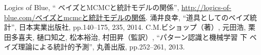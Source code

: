 \documentclass[11pt, a4paper]{jarticle}
\begin{document}
\begin{thebibliography}{9}
	\bibitem{}Logics of Blue, “ ベイズとMCMCと統計モデルの関係”, \url{http://logics-of-blue.com/ベイズとmcmcと統計モデルの関係}.
	涌井良幸, ``道具としてのベイズ統計'', 日本実業出版社, pp.140--175, 235, 2014.%
	  C.M.ビショップ（著）, 元田浩, 栗田多喜夫, 樋口知之, 松本裕治, 村田昇（監訳）,  ``パターン認識と機械学習 下 ベイズ理論による統計的予測'', 丸善出版, pp.252--261, 2013.%

\end{thebibliography}
\end{document}
